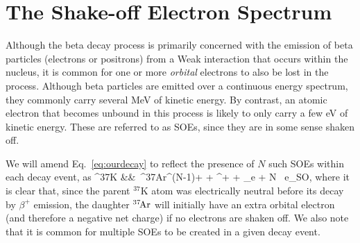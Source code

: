 





















\section{The Shake-off Electron Spectrum}
\label{section:soe_intro}
Although the beta decay process is primarily concerned with the emission of beta particles (electrons or positrons) from a Weak interaction that occurs within the nucleus, it is common for one or more \emph{orbital} electrons to also be lost in the process.  Although beta particles are emitted over a continuous energy spectrum, they commonly carry several MeV of kinetic energy.  By contrast, an atomic electron that becomes unbound in this process is likely to only carry a few eV of kinetic energy.  These are referred to as \acp{SOE}, since they are in some sense shaken off.

We will amend Eq.~\ref{eq:ourdecay} to reflect the presence of $N$ such \ac{SOE}s within each decay event, as
\bea
^{37}\textrm{K} &\rightarrow& \,^{37}\textrm{\!Ar}^{(N-1)+} + \beta^{+} + \nu_e + N \, e_{\textrm{SO}}, 
\label{eq:ourdecay_withsoe}
\eea
where it is clear that, since the parent $^{37}\textrm{K}$ atom was electrically neutral before its decay by $\beta^+$ emission, the daughter $^{37}\textrm{\!Ar}$ will initially have an extra
orbital electron (and therefore a negative net charge) if no electrons are shaken off.  We also note that it is common for multiple SOEs to be created in a given decay event.  


